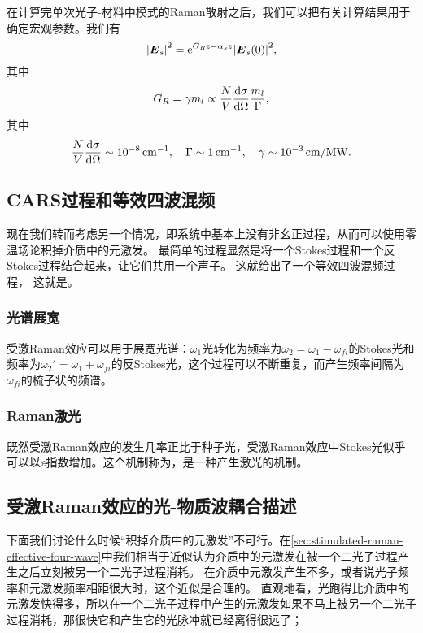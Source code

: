 在计算完单次光子-材料中模式的Raman散射之后，我们可以把有关计算结果用于确定宏观参数。我们有
\begin{equation}
    \abs{\vb*{E}_s}^2 = \mathrm{e}^{G_R z - \alpha_s z} \abs{\vb*{E}_s(0)}^2,
\end{equation}
其中
\begin{equation}
    G_R = \gamma m_l \propto \frac{N}{V} \dv{\sigma}{\Omega} \frac{m_l}{\Gamma},
\end{equation}
其中
\[
    \frac{N}{V} \dv{\sigma}{\Omega} \sim \SI{e-8}{cm^{-1}}, \quad \Gamma \sim \SI{1}{cm^{-1}}, \quad \gamma \sim \SI{e-3}{cm/MW}.
\]

\subsection{CARS过程和等效四波混频}\label{sec:stimulated-raman-effective-four-wave}

现在我们转而考虑另一个情况，即系统中基本上没有非幺正过程，从而可以使用零温场论积掉介质中的元激发。
最简单的过程显然是将一个Stokes过程和一个反Stokes过程结合起来，让它们共用一个声子。
这就给出了一个等效四波混频过程，%
这就是。

\subsubsection{光谱展宽}

受激Raman效应可以用于展宽光谱：$\omega_1$光转化为频率为$\omega_2 = \omega_1 - \omega_{fi}$的Stokes光和频率为$\omega_2' = \omega_1 + \omega_{fi}$的反Stokes光，这个过程可以不断重复，而产生频率间隔为$\omega_{fi}$的梳子状的频谱。

\subsubsection{Raman激光}

既然受激Raman效应的发生几率正比于种子光，受激Raman效应中Stokes光似乎可以以$\ee$指数增加。这个机制称为，是一种产生激光的机制。

\subsection{受激Raman效应的光-物质波耦合描述}

下面我们讨论什么时候“积掉介质中的元激发”不可行。在\autoref{sec:stimulated-raman-effective-four-wave}中我们相当于近似认为介质中的元激发在被一个二光子过程产生之后立刻被另一个二光子过程消耗。
在介质中元激发产生不多，或者说光子频率和元激发频率相距很大时，这个近似是合理的。
直观地看，光跑得比介质中的元激发快得多，所以在一个二光子过程中产生的元激发如果不马上被另一个二光子过程消耗，那很快它和产生它的光脉冲就已经离得很远了；

